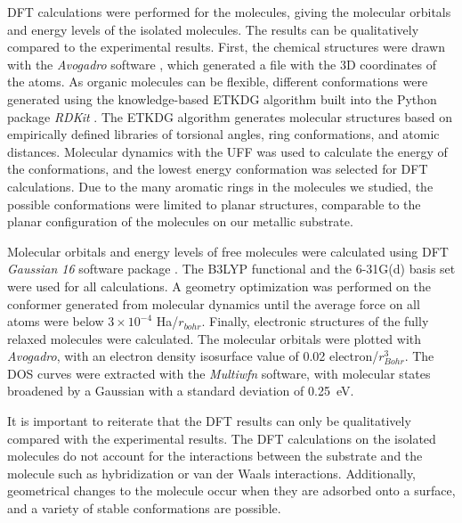 \Acf{DFT} calculations were performed for the molecules, giving the molecular orbitals and energy levels of the isolated molecules. The results can be qualitatively compared to the experimental results. First, the chemical structures were drawn with the \textit{Avogadro} software \citep{hanwell2012avogadro}, which generated a file with the \ac{3D} coordinates of the atoms. As organic molecules can be flexible, different conformations were generated using the knowledge-based \ac{ETKDG} algorithm \citep{riniker2015better} built into the Python package \textit{RDKit} \citep{rdkit}. The \ac{ETKDG} algorithm generates molecular structures based on empirically defined libraries of torsional angles, ring conformations, and atomic distances. Molecular dynamics with the \ac{UFF} \citep{rappe1992uff} was used to calculate the energy of the conformations, and the lowest energy conformation was selected for \ac{DFT} calculations. Due to the many aromatic rings in the molecules we studied, the possible conformations were limited to planar structures, comparable to the planar configuration of the molecules on our metallic substrate.

Molecular orbitals and energy levels of free molecules were calculated using \ac{DFT} \emph{Gaussian 16} software package \citep{frisch2016gaussian}. The \ac{B3LYP} functional \citep{lee1988development, becke1993becke} and the 6-31G(d) \citep{frisch1984self} basis set were used for all calculations. A geometry optimization was performed on the conformer generated from molecular dynamics until the average force on all atoms were below $3\times 10^{-4}$ Ha/$r_{bohr}$. Finally, electronic structures of the fully relaxed molecules were calculated. The molecular orbitals were plotted with \textit{Avogadro}, with an electron density isosurface value of 0.02 electron/$r_{Bohr}^3$. The \ac{DOS} curves were extracted with the \textit{Multiwfn} software, with molecular states broadened by a Gaussian with a standard deviation of \SI{0.25}{eV}.

It is important to reiterate that the \ac{DFT} results can only be qualitatively compared with the experimental results. The \ac{DFT} calculations on the isolated molecules do not account for the interactions between the substrate and the molecule such as hybridization or van der Waals interactions. Additionally, geometrical changes to the molecule occur when they are adsorbed onto a surface, and a variety of stable conformations are possible.

